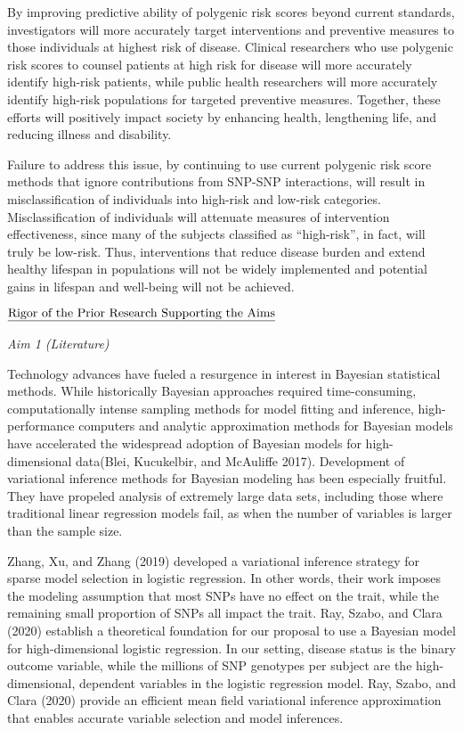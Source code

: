 \documentclass[
  11pt,
  letterpaper,
  DIV=11,
  numbers=noendperiod]{scrartcl}
\begin{document}
By improving predictive ability of polygenic risk scores beyond current
standards, investigators will more accurately target interventions and
preventive measures to those individuals at highest risk of disease.
Clinical researchers who use polygenic risk scores to counsel patients
at high risk for disease will more accurately identify high-risk
patients, while public health researchers will more accurately identify
high-risk populations for targeted preventive measures. Together, these
efforts will positively impact society by enhancing health, lengthening
life, and reducing illness and disability.

Failure to address this issue, by continuing to use current polygenic
risk score methods that ignore contributions from SNP-SNP interactions,
will result in misclassification of individuals into high-risk and
low-risk categories. Misclassification of individuals will attenuate
measures of intervention effectiveness, since many of the subjects
classified as ``high-risk'', in fact, will truly be low-risk. Thus,
interventions that reduce disease burden and extend healthy lifespan in
populations will not be widely implemented and potential gains in
lifespan and well-being will not be achieved.

\(\text{\underline{Rigor of the Prior Research Supporting the Aims}}\)

\emph{Aim 1 (Literature)}

Technology advances have fueled a resurgence in interest in Bayesian
statistical methods. While historically Bayesian approaches required
time-consuming, computationally intense sampling methods for model
fitting and inference, high-performance computers and analytic
approximation methods for Bayesian models have accelerated the
widespread adoption of Bayesian models for high-dimensional data(Blei,
Kucukelbir, and McAuliffe 2017). Development of variational inference
methods for Bayesian modeling has been especially fruitful. They have
propeled analysis of extremely large data sets, including those where
traditional linear regression models fail, as when the number of
variables is larger than the sample size.

Zhang, Xu, and Zhang (2019) developed a variational inference strategy
for sparse model selection in logistic regression. In other words, their
work imposes the modeling assumption that most SNPs have no effect on
the trait, while the remaining small proportion of SNPs all impact the
trait. Ray, Szabo, and Clara (2020) establish a theoretical foundation
for our proposal to use a Bayesian model for high-dimensional logistic
regression. In our setting, disease status is the binary outcome
variable, while the millions of SNP genotypes per subject are the
high-dimensional, dependent variables in the logistic regression model.
Ray, Szabo, and Clara (2020) provide an efficient mean field variational
inference approximation that enables accurate variable selection and
model inferences.
\end{document}
